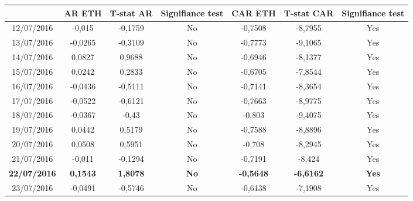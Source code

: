 \documentclass[11pt]{report}
\begin{document}
\begin{table}[]
\centering
\begin{tabular}{c|c|c|c|c|c|c|}
\cline{2-7}
                                          & AR ETH          & T-stat AR       & Signifiance test & CAR ETH          & T-stat CAR       & Signifiance test \\ \hline
\multicolumn{1}{|c|}{12/07/2016}          & -0,015          & -0,1759         & No               & -0,7508          & -8,7955          & Yes              \\ \hline
\multicolumn{1}{|c|}{13/07/2016}          & -0,0265         & -0,3109         & No               & -0,7773          & -9,1065          & Yes              \\ \hline
\multicolumn{1}{|c|}{14/07/2016}          & 0,0827          & 0,9688          & No               & -0,6946          & -8,1377          & Yes              \\ \hline
\multicolumn{1}{|c|}{15/07/2016}          & 0,0242          & 0,2833          & No               & -0,6705          & -7,8544          & Yes              \\ \hline
\multicolumn{1}{|c|}{16/07/2016}          & -0,0436         & -0,5111         & No               & -0,7141          & -8,3654          & Yes              \\ \hline
\multicolumn{1}{|c|}{17/07/2016}          & -0,0522         & -0,6121         & No               & -0,7663          & -8,9775          & Yes              \\ \hline
\multicolumn{1}{|c|}{18/07/2016}          & -0,0367         & -0,43           & No               & -0,803           & -9,4075          & Yes              \\ \hline
\multicolumn{1}{|c|}{19/07/2016}          & 0,0442          & 0,5179          & No               & -0,7588          & -8,8896          & Yes              \\ \hline
\multicolumn{1}{|c|}{20/07/2016}          & 0,0508          & 0,5951          & No               & -0,708           & -8,2945          & Yes              \\ \hline
\multicolumn{1}{|c|}{21/07/2016}          & -0,011          & -0,1294         & No               & -0,7191          & -8,424           & Yes              \\ \hline
\multicolumn{1}{|c|}{\textbf{22/07/2016}} & \textbf{0,1543} & \textbf{1,8078} & \textbf{No}      & \textbf{-0,5648} & \textbf{-6,6162} & \textbf{Yes}     \\ \hline
\multicolumn{1}{|c|}{23/07/2016}          & -0,0491         & -0,5746         & No               & -0,6138          & -7,1908          & Yes              \\ \hline

\end{tabular}
\end{table}
\end{document}
